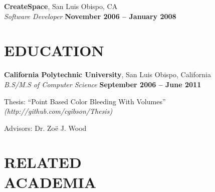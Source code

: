 \documentclass[margin,line]{resume}
\begin{document}
\begin{resume}
    \textbf{\listing CreateSpace}, San Luis Obispo, CA \vspace{2mm}\\\vspace{1mm}%
    \textsl{Software Developer} \hfill \textbf{November 2006 -- January 2008}
    

\sectionline

    \section{\mysidestyle \textbf{\large{E}\small{DUCATION}}}

    \textbf{\listing California Polytechnic University}, San Luis Obispo, California \vspace{2mm}\\\vspace{1mm}%
    \textsl{B.S/M.S of Computer Science} \hfill \textbf{ September 2006 -- June 2011}\vspace{-3mm}\\\vspace{-1mm}%
    \begin{list2}
        \item Thesis: ``Point Based Color Bleeding With Volumes'' \textsl{(http://github.com/cgibson/Thesis)}
        \item Advisors:  Dr. Zo\"{e} J. Wood
    \end{list2}\vspace{-1.5mm}


\sectionline

    \section{\mysidestyle \textbf{\large{R}\small{ELATED\\ACADEMIA}}} 


\end{resume}
\end{document}

